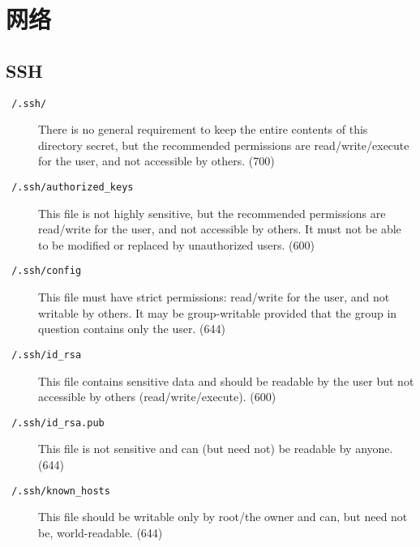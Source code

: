 \documentclass[12pt]{ctexart}
\theoremstyle{definition}
\begin{document}
    \section{网络}

    \subsection{SSH}

    \begin{description}
        \item[\texttt{~/.ssh/}] There is no general requirement to keep the entire contents of this directory secret, but the recommended permissions are read/write/execute for the user, and not accessible by others. (700)
        \item[\texttt{~/.ssh/authorized\_keys}] This file is not highly sensitive, but the recommended permissions are read/write for the user, and not accessible by others. It must not be able to be modified or replaced by unauthorized users. (600)
        \item[\texttt{~/.ssh/config}] This file must have strict permissions: read/write for the user, and not writable by others. It may be group-writable provided that the group in question contains only the user. (644)
        \item[\texttt{~/.ssh/id\_rsa}] This file contains sensitive data and should be readable by the user but not accessible by others (read/write/execute). (600)
        \item[\texttt{~/.ssh/id\_rsa.pub}] This file is not sensitive and can (but need not) be readable by anyone. (644)
        \item[\texttt{~/.ssh/known\_hosts}] This file should be writable only by root/the owner and can, but need not be, world-readable. (644)
    \end{description}
\end{document}
